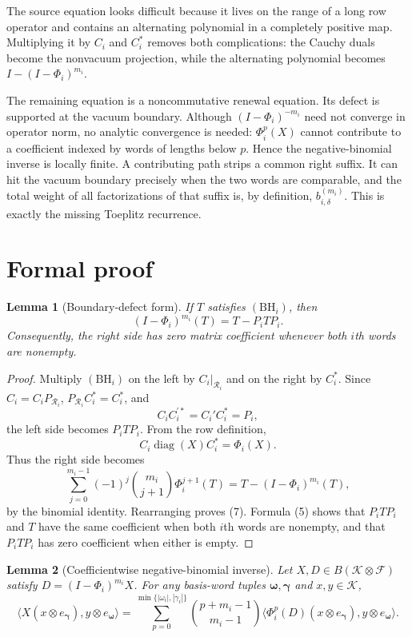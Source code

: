 \documentclass[11pt]{article}
\newtheorem{lemma}{Lemma}
\newcommand{\cK}{\mathcal K}
\newcommand{\cF}{\mathcal F}
\newcommand{\cR}{\mathcal R}
\begin{document}
The source equation looks difficult because it lives on the range of a long row operator and contains an alternating polynomial in a completely positive map.  Multiplying it by $C_i$ and $C_i^*$ removes both complications: the Cauchy duals become the nonvacuum projection, while the alternating polynomial becomes $I-(I-\Phi_i)^{m_i}$.

The remaining equation is a noncommutative renewal equation.  Its defect is supported at the vacuum boundary.  Although $(I-\Phi_i)^{-m_i}$ need not converge in operator norm, no analytic convergence is needed: $\Phi_i^p(X)$ cannot contribute to a coefficient indexed by words of lengths below $p$.  Hence the negative-binomial inverse is locally finite.  A contributing path strips a common right suffix.  It can hit the vacuum boundary precisely when the two words are comparable, and the total weight of all factorizations of that suffix is, by definition, $b_{i,\delta}^{(m_i)}$.  This is exactly the missing Toeplitz recurrence.

\section*{Formal proof}

\begin{lemma}[Boundary-defect form]\label{lem:defect}
If $T$ satisfies $(\mathrm{BH}_i)$, then
\[
 (I-\Phi_i)^{m_i}(T)=T-P_iTP_i.                                    \tag{7}
\]
Consequently, the right side has zero matrix coefficient whenever both $i$th words are nonempty.
\end{lemma}

\begin{proof}
Multiply $(\mathrm{BH}_i)$ on the left by $C_i|_{\cR_i}$ and on the right by $C_i^*$.  Since $C_i=C_iP_{\cR_i}$, $P_{\cR_i}C_i^*=C_i^*$, and
\[
 C_iC_i^{\prime *}=C_i'C_i^*=P_i,
\]
the left side becomes $P_iTP_i$.  From the row definition,
\[
 C_i\operatorname{diag}(X)C_i^*=\Phi_i(X).
\]
Thus the right side becomes
\[
 \sum_{j=0}^{m_i-1}(-1)^j\binom{m_i}{j+1}\Phi_i^{j+1}(T)
 =T-(I-\Phi_i)^{m_i}(T),
\]
by the binomial identity.  Rearranging proves (7).  Formula (5) shows that $P_iTP_i$ and $T$ have the same coefficient when both $i$th words are nonempty, and that $P_iTP_i$ has zero coefficient when either is empty.
\end{proof}

\begin{lemma}[Coefficientwise negative-binomial inverse]\label{lem:inverse}
Let $X,D\in B(\cK\otimes\cF)$ satisfy $D=(I-\Phi_i)^{m_i}X$.  For any basis-word tuples $\boldsymbol\omega,\boldsymbol\gamma$ and $x,y\in\cK$,
\[
 \langle X(x\otimes e_{\boldsymbol\gamma}),y\otimes e_{\boldsymbol\omega}\rangle
 =\sum_{p=0}^{\min\{|\omega_i|,|\gamma_i|\}}
 \binom{p+m_i-1}{m_i-1}
 \langle\Phi_i^p(D)(x\otimes e_{\boldsymbol\gamma}),
              y\otimes e_{\boldsymbol\omega}\rangle.              \tag{8}
\]
\end{lemma}
\end{document}
